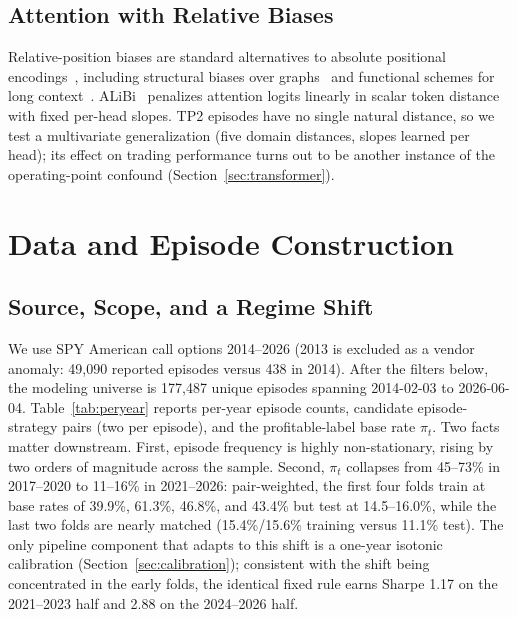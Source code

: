 \documentclass[sigconf,review]{acmart}
\begin{document}
\subsection{Attention with Relative Biases}
Relative-position biases are standard alternatives to absolute positional encodings~\cite{shaw2018self,raffel2020t5}, including structural biases over graphs~\cite{ying2021graphormer} and functional schemes for long context~\cite{li2024fire}. ALiBi~\cite{press2022alibi} penalizes attention logits linearly in scalar token distance with fixed per-head slopes. TP2 episodes have no single natural distance, so we test a multivariate generalization (five domain distances, slopes learned per head); its effect on trading performance turns out to be another instance of the operating-point confound (Section~\ref{sec:transformer}).

\section{Data and Episode Construction}
\label{sec:data}

\subsection{Source, Scope, and a Regime Shift}
\label{sec:data-source}
We use SPY American call options 2014--2026 (2013 is excluded as a vendor anomaly: 49{,}090 reported episodes versus 438 in 2014). After the filters below, the modeling universe is 177{,}487 unique episodes spanning 2014-02-03 to 2026-06-04. Table~\ref{tab:peryear} reports per-year episode counts, candidate episode-strategy pairs (two per episode), and the profitable-label base rate $\pi_t$. Two facts matter downstream. First, episode frequency is highly non-stationary, rising by two orders of magnitude across the sample. Second, $\pi_t$ collapses from 45--73\% in 2017--2020 to 11--16\% in 2021--2026: pair-weighted, the first four folds train at base rates of 39.9\%, 61.3\%, 46.8\%, and 43.4\% but test at 14.5--16.0\%, while the last two folds are nearly matched (15.4\%/15.6\% training versus 11.1\% test). The only pipeline component that adapts to this shift is a one-year isotonic calibration (Section~\ref{sec:calibration}); consistent with the shift being concentrated in the early folds, the identical fixed rule earns Sharpe 1.17 on the 2021--2023 half and 2.88 on the 2024--2026 half.
\end{document}
